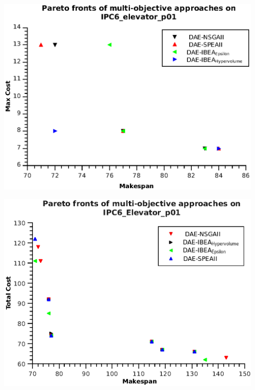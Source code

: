 \documentclass[a4paper,10pt]{report} %
\begin{document}
\begin{center}
 \includegraphics{./pareto_p01_max.eps}
\end{center}
\begin{center}
 \includegraphics{./pareto_p01_add.eps}
\end{center}
\end{document}
